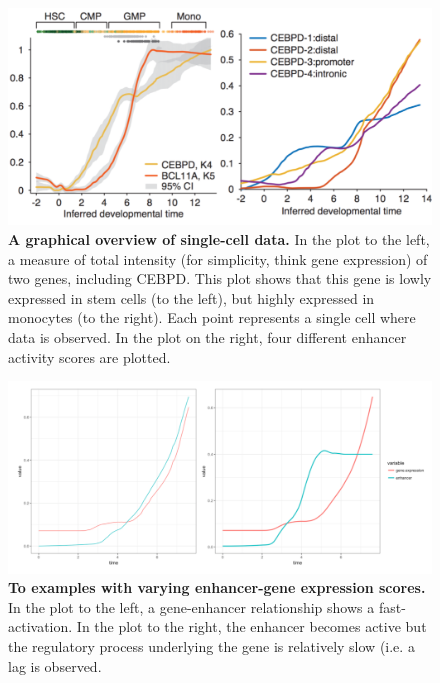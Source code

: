 \documentclass{article}\usepackage[]{graphicx}\usepackage[]{color}
\begin{document}
 \begin{figure}[ht]
    \centering
    \includegraphics[width=\textwidth]{zero.png}
    \caption{\textbf{A graphical overview of single-cell data.} In the plot to the left, a measure of total intensity (for simplicity, think gene expression) of two genes, including CEBPD. This plot shows that this gene is lowly expressed in stem cells (to the left), but highly expressed in monocytes (to the right). Each point represents a single cell where data is observed. In the plot on the right, four different enhancer activity scores are plotted. }
    \label{fig:zero}
\end{figure}
 
\begin{figure}[ht]
    \centering
    \includegraphics[width=\textwidth]{one.png}
    \caption{\textbf{To examples with varying enhancer-gene expression scores.} In the plot to the left, a gene-enhancer relationship shows a fast-activation. In the plot to the right, the enhancer becomes active but the regulatory process underlying the gene is relatively slow (i.e. a lag is observed.}
    \label{fig:one}
\end{figure}
\end{document}
